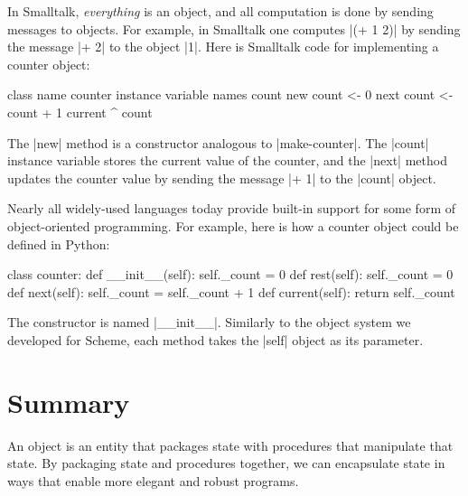 \begin{schemeregion}

In Smalltalk, \emph{everything} is an object, and all computation is done by sending messages to objects.  For example, in Smalltalk one computes \scheme|(+ 1 2)| by sending the message \scheme|+ 2| to the object \scheme|1|.  Here is Smalltalk code for implementing a counter object:
\begin{pythoncode} 
class name counter
   instance variable names count
   new count <- 0
   next count <- count + 1
   current ^ count
\end{pythoncode}

The \scheme|new| method is a constructor analogous to \scheme|make-counter|.  The \scheme|count| instance variable stores the current value of the counter, and the \scheme|next| method updates the counter value by sending the message \scheme|+ 1| to the \scheme|count| object.

Nearly all widely-used languages today provide built-in support for some form of object-oriented programming.  For example, here is how a counter object could be defined in Python:
\begin{pythoncode}
class counter: 
   def __init__(self): self._count = 0
   def rest(self): self._count = 0
   def next(self): self._count = self._count + 1
   def current(self): return self._count
\end{pythoncode}
The constructor is named \scheme|__init__|.  Similarly to the object system we developed for Scheme, each method takes the \scheme|self| object as its parameter. 

\section{Summary}

An object is an entity that packages state with procedures that manipulate that state.  By packaging state and procedures together, we can encapsulate state in ways that enable more elegant and robust programs.  


\end{schemeregion}
